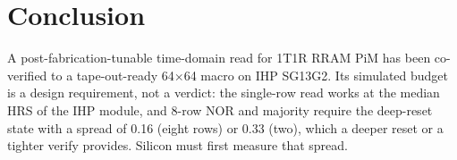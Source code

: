 \section{Conclusion}
\label{sec:concl}
A post-fabrication-tunable time-domain read for 1T1R RRAM PiM has been co-verified to a
tape-out-ready 64$\times$64 macro on IHP SG13G2. Its simulated budget is a design requirement, not
a verdict: the single-row read works at the
median HRS of the IHP module, and 8-row NOR and majority require the deep-reset state with a spread of 0.16
(eight rows) or 0.33 (two), which a deeper reset or a tighter verify provides. Silicon must first measure that spread.

